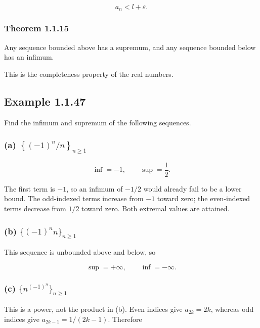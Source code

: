 \documentclass[11pt,a4paper]{article}
\begin{document}
\[
a_n<l+\varepsilon.
\]

\subsubsection{Theorem 1.1.15}\label{theorem-1.1.15}

Any sequence bounded above has a supremum, and any sequence bounded
below has an infimum.

This is the completeness property of the real numbers.

\subsection{Example 1.1.47}\label{example-1.1.47}

Find the infimum and supremum of the following sequences.

\subsubsection{\texorpdfstring{(a)
\(\left\{(-1)^n/n\right\}_{n\ge1}\)}{(a) \textbackslash left\textbackslash\{(-1)\^{}n/n\textbackslash right\textbackslash\}\_\{n\textbackslash ge1\}}}\label{a-left-1nnright_nge1}

\[
\inf=-1,\qquad \sup=\frac12.
\]

The first term is \(-1\), so an infimum of \(-1/2\) would already fail
to be a lower bound. The odd-indexed terms increase from \(-1\) toward
zero; the even-indexed terms decrease from \(1/2\) toward zero. Both
extremal values are attained.

\subsubsection{\texorpdfstring{(b)
\(\{(-1)^n n\}_{n\ge1}\)}{(b) \textbackslash\{(-1)\^{}n n\textbackslash\}\_\{n\textbackslash ge1\}}}\label{b--1n-n_nge1}

This sequence is unbounded above and below, so

\[
\sup=+\infty,
\qquad\inf=-\infty.
\]

\subsubsection{\texorpdfstring{(c)
\(\{n^{(-1)^n}\}_{n\ge1}\)}{(c) \textbackslash\{n\^{}\{(-1)\^{}n\}\textbackslash\}\_\{n\textbackslash ge1\}}}\label{c-n-1n_nge1}

This is a power, not the product in (b). Even indices give
\(a_{2k}=2k\), whereas odd indices give \(a_{2k-1}=1/(2k-1)\). Therefore
\end{document}
